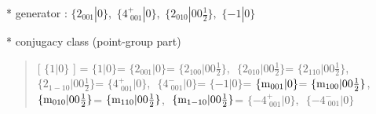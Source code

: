 \documentclass[fleqn,10pt,landscape]{jsarticle}
\begin{document}
* generator : $\{2{}_{001}|0\},\,\,\{4^{+}_{\,\,001}|0\},\,\,\{2{}_{010}|0 0 \frac{1}{2}\},\,\,\{-1|0\}$

* conjugacy class (point-group part)
\begin{quote}
[ $\{1|0\}$ ] = \quad $\{1|0\}$\newline[ $\{2{}_{001}|0\}$ ] = \quad $\{2{}_{001}|0\}$\newline[ $\{2{}_{100}|0 0 \frac{1}{2}\}$ ] = \quad $\{2{}_{100}|0 0 \frac{1}{2}\}$,\,\, $\{2{}_{010}|0 0 \frac{1}{2}\}$\newline[ $\{2{}_{110}|0 0 \frac{1}{2}\}$ ] = \quad $\{2{}_{110}|0 0 \frac{1}{2}\}$,\,\, $\{2{}_{1-10}|0 0 \frac{1}{2}\}$\newline[ $\{4^{+}_{\,\,001}|0\}$ ] = \quad $\{4^{+}_{\,\,001}|0\}$,\,\, $\{4^{-}_{\,\,001}|0\}$\newline[ $\{-1|0\}$ ] = \quad $\{-1|0\}$\newline[ $\{{\rm m}_{001}|0\}$ ] = \quad $\{{\rm m}_{001}|0\}$\newline[ $\{{\rm m}_{100}|0 0 \frac{1}{2}\}$ ] = \quad $\{{\rm m}_{100}|0 0 \frac{1}{2}\}$,\,\, $\{{\rm m}_{010}|0 0 \frac{1}{2}\}$\newline[ $\{{\rm m}_{110}|0 0 \frac{1}{2}\}$ ] = \quad $\{{\rm m}_{110}|0 0 \frac{1}{2}\}$,\,\, $\{{\rm m}_{1-10}|0 0 \frac{1}{2}\}$\newline[ $\{-4^{+}_{\,\,001}|0\}$ ] = \quad $\{-4^{+}_{\,\,001}|0\}$,\,\, $\{-4^{-}_{\,\,001}|0\}$\newline
\end{quote}
\end{document}
